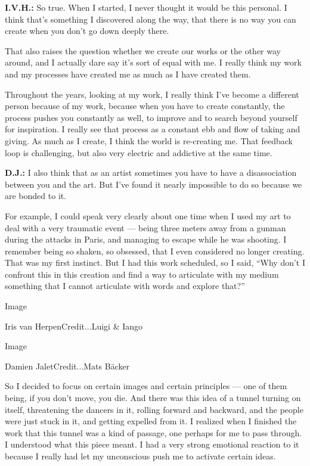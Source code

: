 \textbf{I.V.H.:} So true. When I started, I never thought it would be
this personal. I think that's something I discovered along the way, that
there is no way you can create when you don't go down deeply there.

That also raises the question whether we create our works or the other
way around, and I actually dare say it's sort of equal with me. I really
think my work and my processes have created me as much as I have created
them.

Throughout the years, looking at my work, I really think I've become a
different person because of my work, because when you have to create
constantly, the process pushes you constantly as well, to improve and to
search beyond yourself for inspiration. I really see that process as a
constant ebb and flow of taking and giving. As much as I create, I think
the world is re-creating me. That feedback loop is challenging, but also
very electric and addictive at the same time.

\textbf{D.J.:} I also think that as an artist sometimes you have to have
a disassociation between you and the art. But I've found it nearly
impossible to do so because we are bonded to it.

For example, I could speak very clearly about one time when I used my
art to deal with a very traumatic event --- being three meters away from
a gunman during the attacks in Paris, and managing to escape while he
was shooting. I remember being so shaken, so obsessed, that I even
considered no longer creating. That was my first instinct. But I had
this work scheduled, so I said, ``Why don't I confront this in this
creation and find a way to articulate with my medium something that I
cannot articulate with words and explore that?''

Image

Iris van HerpenCredit...Luigi \& Iango

Image

Damien JaletCredit...Mats Bäcker

So I decided to focus on certain images and certain principles --- one
of them being, if you don't move, you die. And there was this idea of a
tunnel turning on itself, threatening the dancers in it, rolling forward
and backward, and the people were just stuck in it, and getting expelled
from it. I realized when I finished the work that this tunnel was a kind
of passage, one perhaps for me to pass through. I understood what this
piece meant. I had a very strong emotional reaction to it because I
really had let my unconscious push me to activate certain ideas.

